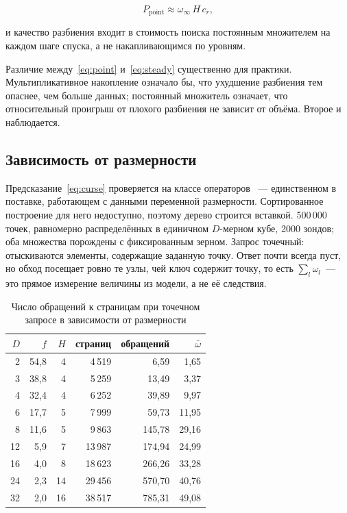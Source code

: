 \begin{equation}
\label{eq:steady}
P_{\text{point}} \approx \omega_\infty \, H \, c_r ,
\end{equation}

и качество разбиения входит в стоимость поиска постоянным множителем на каждом
шаге спуска, а не накапливающимся по уровням.

Различие между~\eqref{eq:point} и~\eqref{eq:steady} существенно для практики.
Мультипликативное накопление означало бы, что ухудшение разбиения тем опаснее,
чем больше данных; постоянный множитель означает, что относительный проигрыш от
плохого разбиения не зависит от объёма. Второе и наблюдается.

\subsection{Зависимость от размерности}

Предсказание~\eqref{eq:curse} проверяется на классе операторов ~---
единственном в поставке, работающем с данными переменной размерности.
Сортированное построение для него недоступно, поэтому дерево строится вставкой.
500\,000 точек, равномерно распределённых в единичном $D$-мерном кубе, 2000
зондов; оба множества порождены с фиксированным зерном. Запрос точечный:
отыскиваются элементы, содержащие заданную точку. Ответ почти всегда пуст, но
обход посещает ровно те узлы, чей ключ содержит точку, то есть
$\sum_l \omega_l$~--- это прямое измерение величины из модели, а не её
следствия.

\begin{table}[htbp]
\centering
\caption{Число обращений к страницам при точечном запросе в зависимости от
размерности}
\label{tab:dim}
\begin{tabular}{rrrrrr}
\toprule
$D$ & $f$ & $H$ & страниц & обращений & $\bar\omega$ \\
\midrule
2 & 54,8 & 4 & 4\,519 & 6,59 & 1,65 \\
3 & 38,8 & 4 & 5\,259 & 13,49 & 3,37 \\
4 & 32,4 & 4 & 6\,252 & 39,89 & 9,97 \\
6 & 17,7 & 5 & 7\,999 & 59,73 & 11,95 \\
8 & 11,6 & 5 & 9\,863 & 145,78 & 29,16 \\
12 & 5,9 & 7 & 13\,987 & 174,94 & 24,99 \\
16 & 4,0 & 8 & 18\,623 & 266,26 & 33,28 \\
24 & 2,3 & 14 & 29\,456 & 570,70 & 40,76 \\
32 & 2,0 & 16 & 38\,517 & 785,31 & 49,08 \\
\bottomrule
\end{tabular}
\end{table}

